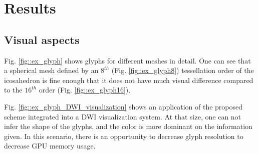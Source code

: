 \documentclass[twoside,twocolumn,10pt]{article}
\begin{document}




\section{Results}
\label{sec::results}

\subsection{Visual aspects}

Fig. \ref{fig::ex_glyph} shows glyphs for different meshes in detail. One can see that a spherical mesh defined by an $8^{th}$ (Fig. \ref{fig::ex_glyph8}) tessellation order of the icosahedron is fine enough that it does not have much visual difference compared to the $16^{th}$ order (Fig. \ref{fig::ex_glyph16}).

Fig. \ref{fig::ex_glyph_DWI_visualization} shows an application of the proposed scheme integrated into a DWI visualization system. At that size, one can not infer the shape of the glyphs, and the color is more dominant on the information given. In this scenario, there is an opportunity to decrease glyph resolution to decrease GPU memory usage.
\end{document}
